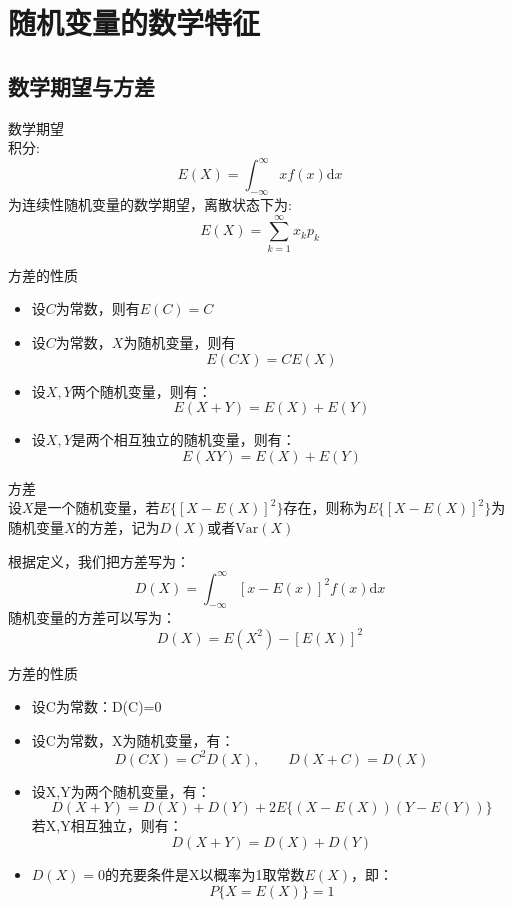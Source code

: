 \section{随机变量的数学特征}
\subsection{数学期望与方差}

\begin{definition}{数学期望}
    \\积分:
    \begin{equation}
        E(X)=\int_{-\infty}^{\infty}xf(x)\mathrm{d} x
    \end{equation}
    为连续性随机变量的数学期望，离散状态下为:
    \begin{equation}
        E(X)=\sum_{k=1}^{\infty}x_k p_k
    \end{equation}
\end{definition}

\begin{prop}{方差的性质}
    \begin{itemize}
        \item 设$C$为常数，则有$E(C)=C$
        \item 设$C$为常数，$X$为随机变量，则有$$ E(CX)=CE(X) $$
        \item 设$X,Y$两个随机变量，则有：$$ E(X+Y)=E(X)+E(Y) $$
        \item 设$X,Y$是两个相互独立的随机变量，则有：$$ E(XY)=E(X)+E(Y) $$
    \end{itemize}
\end{prop}

\begin{definition}{方差\\}
    \setlength{\parindent}{2em}设$X$是一个随机变量，若$E\{ [X-E(X)]^2 \}$存在，则称为$E\{ [X-E(X)]^2 \}$为随机变量$X$的方差，记为$D(X)$或者$\mathrm{Var}(X)$
\end{definition}
\setlength{\parindent}{2em}根据定义，我们把方差写为：
\begin{equation}
    D(X)=\int^{\infty}_{-\infty} [x-E(x)]^2 f(x) \mathrm{d} x
\end{equation}
随机变量的方差可以写为：
\begin{equation}
    D(X)=E(X^2)-[E(X)]^2
\end{equation}

\begin{prop}{方差的性质}
    \begin{itemize}
        \item 设C为常数：D(C)=0
        \item 设C为常数，X为随机变量，有：$$D(CX)=C^2D(X),\qquad D(X+C)=D(X)$$
        \item 设X,Y为两个随机变量，有：$$D(X+Y)=D(X)+D(Y)+2E\{ (X-E(X))(Y-E(Y)) \}$$ 若X,Y相互独立，则有：$$ D(X+Y)=D(X)+D(Y) $$
        \item $D(X)=0$的充要条件是X以概率为1取常数$E(X)$，即：$$ P\{ X=E(X) \}=1 $$
    \end{itemize}
\end{prop}

